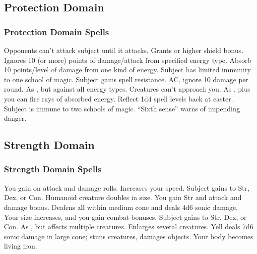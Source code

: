 \subsection{Protection Domain}
\subsubsection{Protection Domain Spells}
\begin{spelllist}
   Opponents can't attack subject until it attacks.
   Grants  or higher shield bonus.
   Ignores 10 (or more) points of damage/attack from specified energy type.
  \spellhead[2]{}
   Absorb 10 points/level of damage from one kind of energy.
   Subject has limited immunity to one school of magic. 
   Subject gains spell resistance.
    AC, ignore 10 damage per round.
  \spellhead[5]{}
  \spellhead[5]{}
   As , but against all energy types.
   Creatures can't approach you.
   As , plus you can fire rays of absorbed energy.
   Reflect 1d4 spell levels back at caster.
  \spellhead[8]{}
   Subject is immune to two schools of magic.
   ``Sixth sense'' warns of impending danger.
  \spellhead[9]{}
\end{spelllist}

\subsection{Strength Domain}

\subsubsection{Strength Domain Spells}
\begin{spelllist}
   You gain  on attack and damage rolls.
   Increases your speed.
   Subject gains  to Str, Dex, or Con.
  \spellhead[2]{}
   Humanoid creature doubles in size.
  \spellhead[3]{}
   You gain  Str and attack and damage bonus.
   Deafens all within medium cone and deals 4d6 sonic damage.
   Your size increases, and you gain combat bonuses.
   Subject gains  to Str, Dex, or Con.
   As , but affects multiple creatures.
  \spellhead[6]{}
   Enlarges several creatures.
   Yell deals 7d6 sonic damage in large cone; stuns creatures, damages objects.
   Your body becomes living iron.
  \spellhead[8]{}
  \spellhead[9]{}
  \spellhead[9]{} 
\end{spelllist}

